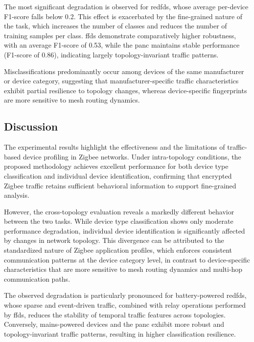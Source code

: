 The most significant degradation is observed for \glspl*{redfd}, whose average per-device F1-score falls below 0.2. This effect is exacerbated by the fine-grained nature of the task, which increases the number of classes and reduces the number of training samples per class. \glspl*{ffd} demonstrate comparatively higher robustness, with an average F1-score of 0.53, while the \gls*{panc} maintains stable performance (F1-score of 0.86), indicating largely topology-invariant traffic patterns.

Misclassifications predominantly occur among devices of the same manufacturer or device category, suggesting that manufacturer-specific traffic characteristics exhibit partial resilience to topology changes, whereas device-specific fingerprints are more sensitive to mesh routing dynamics.

\subsection{Discussion}
The experimental results highlight the effectiveness and the limitations of traffic-based device profiling in Zigbee networks. Under intra-topology conditions, the proposed methodology achieves excellent performance for both device type classification and individual device identification, confirming that encrypted Zigbee traffic retains sufficient behavioral information to support fine-grained analysis.

However, the cross-topology evaluation reveals a markedly different behavior between the two tasks. While device type classification shows only moderate performance degradation, individual device identification is significantly affected by changes in network topology. This divergence can be attributed to the standardized nature of Zigbee application profiles, which enforces consistent communication patterns at the device category level, in contrast to device-specific characteristics that are more sensitive to mesh routing dynamics and multi-hop communication paths.

The observed degradation is particularly pronounced for battery-powered \glspl*{redfd}, whose sparse and event-driven traffic, combined with relay operations performed by \glspl*{ffd}, reduces the stability of temporal traffic features across topologies. Conversely, mains-powered devices and the \gls*{panc} exhibit more robust and topology-invariant traffic patterns, resulting in higher classification resilience.

